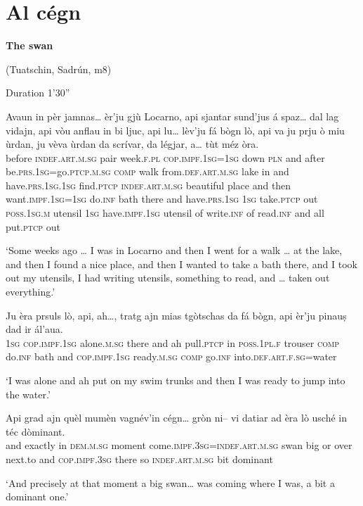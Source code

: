 \section{Al cégn}
\textbf{The swan}


(Tuatschin, Sadrún, m8)


Duration 1'30''
\bigskip

\begin{linenumbers}
\gll  Avaun in pèr jamnas… èr’ju gjù Locarno, api sjantar sund’jus á spaz… dal lag vidajn, api vòu anflau in bi ljuc, api lu… lèv’ju fá bògn lò, api va ju prju ò miu ùrdan, ju vèva ùrdan da scrívar, da légjar, a… tùt méz òra.\\
before \textsc{indef.art.m.sg} pair week.\textsc{f.pl} \textsc{cop.impf.1sg=1sg} down \textsc{pln} and after be.\textsc{prs.1sg=}go.\textsc{ptcp.m.sg} \textsc{comp} walk from.\textsc{def.art.m.sg} lake in and have.\textsc{prs.1sg.1sg} find.\textsc{ptcp} \textsc{indef.art.m.sg} beautiful place and then want.\textsc{impf.1sg=1sg} do.\textsc{inf} bath there and have.\textsc{prs.1sg} \textsc{1sg} take.\textsc{ptcp} out \textsc{poss.1sg.m} utensil \textsc{1sg} have.\textsc{impf.1sg} utensil of write.\textsc{inf} of read.\textsc{inf} and all put.\textsc{ptcp} out  \\
\end{linenumbers}
\medskip
\glt `Some weeks ago … I was in Locarno and then I went for a walk … at the lake, and then I found a nice place, and then I wanted to take a bath there, and I took out my utensils, I had writing utensils, something to read, and … taken out everything.'
\medskip

\begin{linenumbers}
\gll  Ju èra prsuls lò, api, ah…, tratg ajn mias tgòtschas da fá bògn, api èr’ju pinauṣ dad ir ál’aua.  \\
 \textsc{1sg} \textsc{cop.impf.1sg} alone.\textsc{m.sg} there and ah pull.\textsc{ptcp} in \textsc{poss.1pl.f} trouser \textsc{comp} do.\textsc{inf} bath and \textsc{cop.impf.1sg} ready.\textsc{m.sg} \textsc{comp} go.\textsc{inf} into.\textsc{def.art.f.sg}=water\\
\end{linenumbers}
\medskip
\glt `I was alone and ah put on my swim trunks and then I was ready to jump into the water.'
\medskip

\begin{linenumbers}
\gll Api grad ajn quèl mumèn vagnév’in cégn… gròn ni– vi datiar ad èra lò usché in téc dòminant.\\
and exactly in \textsc{dem.m.sg} moment come.\textsc{impf.3sg=indef.art.m.sg} swan big or over next.to and \textsc{cop.impf.3sg} there so \textsc{indef.art.m.sg} bit dominant\\
\end{linenumbers}
\medskip
\glt `And precisely at that moment a big swan… was coming where I was, a bit a dominant one.'
\medskip

